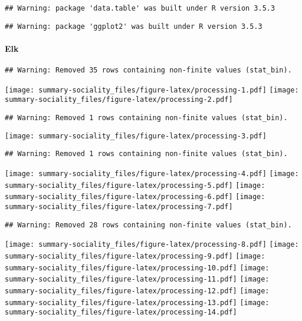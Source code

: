 \documentclass[]{article}
\title{}
\author{}
\date{}
\let\oldparagraph\paragraph
\renewcommand{\paragraph}[1]{\oldparagraph{#1}\mbox{}}
\begin{document}
\begin{verbatim}
## Warning: package 'data.table' was built under R version 3.5.3
\end{verbatim}

\begin{verbatim}
## Warning: package 'ggplot2' was built under R version 3.5.3
\end{verbatim}

\paragraph{Elk}\label{elk}

\begin{verbatim}
## Warning: Removed 35 rows containing non-finite values (stat_bin).
\end{verbatim}

\texttt{[image: summary-sociality\_files/figure-latex/processing-1.pdf]}
\texttt{[image: summary-sociality\_files/figure-latex/processing-2.pdf]}

\begin{verbatim}
## Warning: Removed 1 rows containing non-finite values (stat_bin).
\end{verbatim}

\texttt{[image: summary-sociality\_files/figure-latex/processing-3.pdf]}

\begin{verbatim}
## Warning: Removed 1 rows containing non-finite values (stat_bin).
\end{verbatim}

\texttt{[image: summary-sociality\_files/figure-latex/processing-4.pdf]}
\texttt{[image: summary-sociality\_files/figure-latex/processing-5.pdf]}
\texttt{[image: summary-sociality\_files/figure-latex/processing-6.pdf]}
\texttt{[image: summary-sociality\_files/figure-latex/processing-7.pdf]}

\begin{verbatim}
## Warning: Removed 28 rows containing non-finite values (stat_bin).
\end{verbatim}

\texttt{[image: summary-sociality\_files/figure-latex/processing-8.pdf]}
\texttt{[image: summary-sociality\_files/figure-latex/processing-9.pdf]}
\texttt{[image: summary-sociality\_files/figure-latex/processing-10.pdf]}
\texttt{[image: summary-sociality\_files/figure-latex/processing-11.pdf]}
\texttt{[image: summary-sociality\_files/figure-latex/processing-12.pdf]}
\texttt{[image: summary-sociality\_files/figure-latex/processing-13.pdf]}
\texttt{[image: summary-sociality\_files/figure-latex/processing-14.pdf]}
\end{document}
